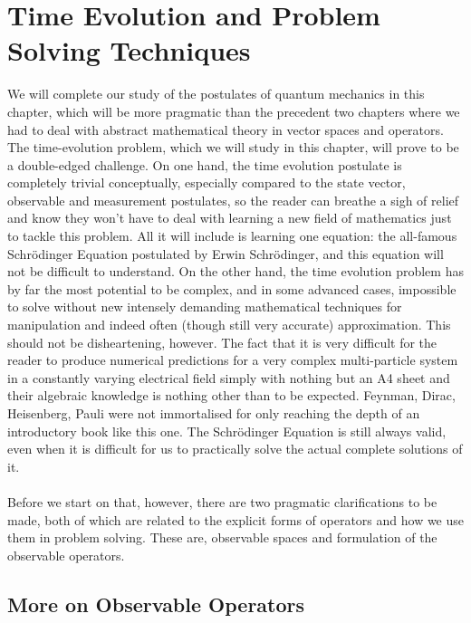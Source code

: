 \chapter{Time Evolution and Problem Solving Techniques}
We will complete our study of the postulates of quantum mechanics in this chapter, which will be more pragmatic than the precedent two chapters where we had to deal with abstract mathematical theory in vector spaces and operators. The time-evolution problem, which we will study in this chapter, will prove to be a double-edged challenge. On one hand, the time evolution postulate is completely trivial conceptually, especially compared to the state vector, observable and measurement postulates, so the reader can breathe a sigh of relief and know they won't have to deal with learning a new field of mathematics just to tackle this problem. All it will include is learning one equation: the all-famous Schr\"{o}dinger Equation postulated by Erwin Schr\"{o}dinger, and this equation will not be difficult to understand. On the other hand, the time evolution problem has by far the most potential to be complex, and in some advanced cases, impossible to solve without new intensely demanding mathematical techniques for manipulation and indeed often (though still very accurate) approximation. This should not be disheartening, however. The fact that it is very difficult for the reader to produce numerical predictions for a very complex multi-particle system in a constantly varying electrical field simply with nothing but an A4 sheet and their algebraic knowledge is nothing other than to be expected. Feynman, Dirac, Heisenberg, Pauli were not immortalised for only reaching the depth of an introductory book like this one. The Schr\"{o}dinger Equation is still always valid, even when it is difficult for us to practically solve the actual complete solutions of it.
\\\\
Before we start on that, however, there are two pragmatic clarifications to be made, both of which are related to the explicit forms of operators and how we use them in problem solving. These are, observable spaces and formulation of the observable operators. 
\section{More on Observable Operators}
